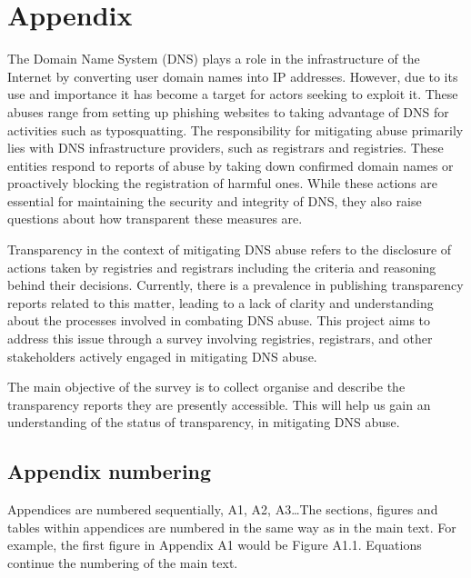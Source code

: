\chapter{Appendix}


The Domain Name System (DNS) plays a role in the infrastructure of the Internet by converting user domain names into IP addresses. However, due to its use and importance it has become a target for actors seeking to exploit it. These abuses range from setting up phishing websites to taking advantage of DNS for activities such as typosquatting. The responsibility for mitigating abuse primarily lies with DNS infrastructure providers, such as registrars and registries. These entities respond to reports of abuse by taking down confirmed domain names or proactively blocking the registration of harmful ones. While these actions are essential for maintaining the security and integrity of DNS, they also raise questions about how transparent these measures are. 

Transparency in the context of mitigating DNS abuse refers to the disclosure of actions taken by registries and registrars including the criteria and reasoning behind their decisions. Currently, there is a prevalence in publishing transparency reports related to this matter, leading to a lack of clarity and understanding about the processes involved in combating DNS abuse. This project aims to address this issue through a survey involving registries, registrars, and other stakeholders actively engaged in mitigating DNS abuse.

The main objective of the survey is to collect organise and describe the transparency reports they are presently accessible. This will help us gain an understanding of the status of transparency, in mitigating DNS abuse.

\section{Appendix numbering}
Appendices are numbered sequentially, A1, A2, A3\ldots The sections, figures and tables within appendices are numbered in the same way as in the main text. For example, the first figure in Appendix A1 would be Figure A1.1. Equations continue the numbering of the main text.
